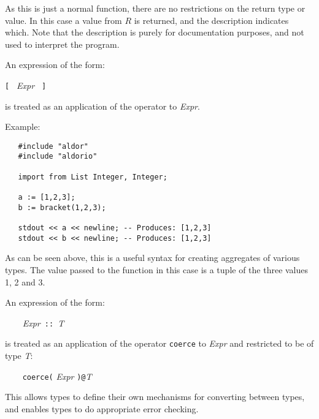 As this is just a normal function, there are no restrictions on the
return type or value. In this case a value from $R$ is returned, and
the description indicates which. Note that the description is purely
for documentation purposes, and not used to interpret the program.


An expression of the form:

{\small \verb^[ ^ {\em Expr} \verb^ ]^}

is treated as an application of the operator  to {\em
Expr}.

Example:

\begin{small}%
\begin{verbatim}
   #include "aldor"
   #include "aldorio"

   import from List Integer, Integer;

   a := [1,2,3];
   b := bracket(1,2,3);

   stdout << a << newline; -- Produces: [1,2,3]
   stdout << b << newline; -- Produces: [1,2,3]

\end{verbatim}
\end{small}

As can be seen above, this is a useful syntax for creating aggregates
of various types. The value passed to the  function in
this case is a tuple of the three values 1, 2 and 3.


An expression of the form:

{\small \verb^    ^{\em Expr}\verb^ :: ^{\em T}}

is treated as an application of the operator \verb"coerce" to {\em
Expr} and restricted to be of type {\em T}:

{\small \verb^    coerce(^ {\em Expr} \verb^)@^{\em T}}

This allows types to define their own mechanisms for converting
between types, and enables types to do appropriate error checking.
